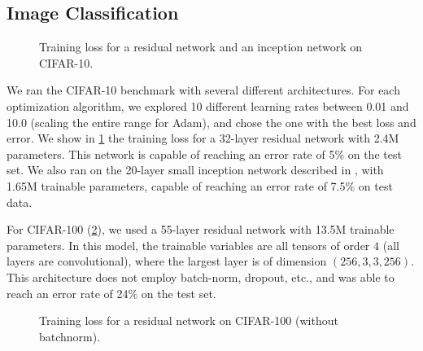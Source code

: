 \subsection{Image Classification}

%
%

\begin{figure}[t]
\centering
\resizebox{1.0\textwidth}{!}{


%
}
\caption{Training loss for a residual network and an inception network on CIFAR-10.}
\label{fig:cifar10}
\end{figure}

%
%

We ran the CIFAR-10 benchmark with several different architectures. 
For each optimization algorithm, we explored 10 different learning rates between 0.01 and 10.0 (scaling the 
entire range for Adam), and chose the one with the best loss and error. 
We show in \cref{fig:cifar10} the training loss for a 32-layer residual network with 2.4M parameters. This
network is capable of reaching an error rate of 5\% on the test set. 
We also ran on the 20-layer small inception network described in \citet{zhang2016understanding},
with 1.65M trainable parameters, capable of reaching an error rate of 7.5\% on test data.

For CIFAR-100 (\cref{fig:cifar100}), we used a 55-layer residual network with 13.5M trainable parameters. In this model, the trainable variables are all
tensors of order $4$ (all layers are convolutional), where the largest layer is of dimension $(256, 3, 3, 256)$.
This architecture does not employ batch-norm, dropout, etc., and was able to reach an error rate of 24\% on the test set.

\begin{figure}[t]
\centering
\resizebox{0.5\textwidth}{!}{

%
}
\caption{Training loss for a residual network on CIFAR-100 (without batchnorm).}
\label{fig:cifar100}
\end{figure}

